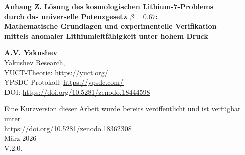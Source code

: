 \documentclass[12pt,a4paper]{article}
\theoremstyle{remark}
\begin{document}
	
	\begin{titlepage}
		\begin{center}
			\vspace*{0cm}
			
			\Huge \textbf{Anhang Z. Lösung des kosmologischen Lithium-7-Problems} \\
			\Huge \textbf{durch das universelle Potenzgesetz \(\beta = 0.67\):} \\
			\Huge \textbf{Mathematische Grundlagen und experimentelle Verifikation} \\
			\Huge \textbf{mittels anomaler Lithiumleitfähigkeit unter hohem Druck}
			
			\vspace{0.5cm}
			\Large \textbf{A.V. Yakushev} \\
			\large Yakushev Research, \\ 
			YUCT-Theorie: \url{https://yuct.org/}\\
			YPSDC-Protokoll: \url{https://ypsdc.com/}\\
			
			\vspace{2cm}
			\textbf DOI: \url{https://doi.org/10.5281/zenodo.18444598}\\
			
			\vspace{1cm}
			
			\vspace{0cm}
			\large 
			Eine Kurzversion dieser Arbeit wurde bereits veröffentlicht und ist verfügbar unter\\ \url{https://doi.org/10.5281/zenodo.18362308}\\
			\vspace{1cm}
			März 2026 \\ \large V.2.0.
			
			
			\newpage
			\begin{minipage}{0.85\textwidth}
				\begin{abstract}
					\noindent
					Wir präsentieren eine strenge mathematische Ableitung des universellen Leitfähigkeitsgesetzes \(\sigma \propto (q-1)^{-\beta}\) mit dem Exponenten \(\beta = 0.67\), das aus der Yakushev Unified Coordination Theory (YUCT) folgt. Unter Verwendung experimenteller Daten zur anomalen Resistivität von Lithium unter Stoßkompression bis 210 GPa (Fortov, Yakushev et al., 2001) kalibrieren wir das Modell und zeigen, dass die beobachtete 15‑fache Zunahme des spezifischen Widerstands eine direkte Folge von Koordinationseffekten ist. Drei blinde experimentelle Vorhersagen werden vorgeschlagen, darunter ein Isotopeneffekt in der Leitfähigkeit \(\sigma_6/\sigma_7 = (7/6)^{0.74} \approx 1.115\), der einen entscheidenden Test der Theorie darstellt. Die Ergebnisse schließen den Kreis vom kosmologischen Lithium zu Labormessungen und etablieren \(\beta = 0.67\) als neue fundamentale Konstante.
				\end{abstract}
			\end{minipage}
			

\end{center}
\end{titlepage}
\end{document}
